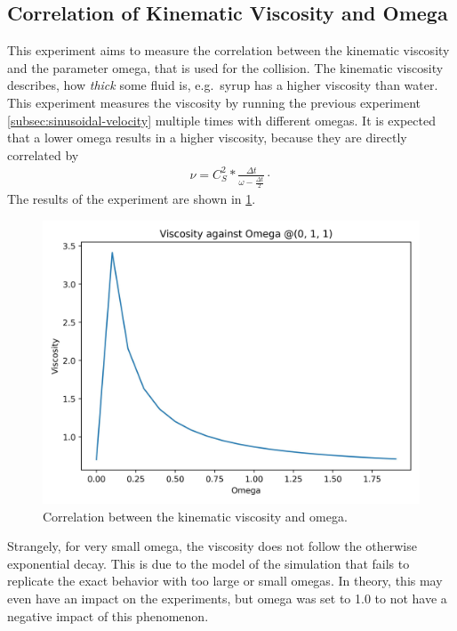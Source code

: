 \subsection{Correlation of Kinematic Viscosity and Omega}
This experiment aims to measure the correlation between the kinematic viscosity and the parameter omega, that is used for the collision.
The kinematic viscosity describes, how \textit{thick} some fluid is, e.g.\ syrup has a higher viscosity than water. %
This experiment measures the viscosity by running the previous experiment \cref{subsec:sinusoidal-velocity} multiple times with different omegas.
It is expected that a lower omega results in a higher viscosity, because they are directly correlated \cite{lecture} by
\begin{equation*}
    \begin{aligned}
        \nu = C^2_S * \frac{\Delta t}{ \omega - \frac{\Delta t}{2}} \cdot
    \end{aligned}
\end{equation*}
The results of the experiment are shown in \cref{fig:swd-vo-viscosity-vs-omega}.

\begin{figure}[H]
    \begin{center}
        \includegraphics[width=0.5\linewidth]{graphs/ShearWaveDecay/Viscosity/viscosity_against_omega}
        \caption{Correlation between the kinematic viscosity and omega.}
        \label{fig:swd-vo-viscosity-vs-omega}
    \end{center}
\end{figure}

Strangely, for very small omega, the viscosity does not follow the otherwise exponential decay.
This is due to the model of the simulation that fails to replicate the exact behavior with too large or small omegas. %
In theory, this may even have an impact on the experiments, but omega was set to 1.0 to not have a negative impact of this phenomenon.


